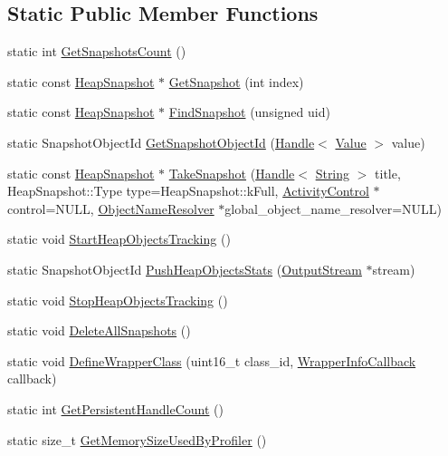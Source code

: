 \subsection*{Static Public Member Functions}
\begin{DoxyCompactItemize}
\item 
static int \hyperlink{classv8_1_1_heap_profiler_a739a665268bba6e640890464ccb60d26}{Get\+Snapshots\+Count} ()
\item 
static const \hyperlink{classv8_1_1_heap_snapshot}{Heap\+Snapshot} $\ast$ \hyperlink{classv8_1_1_heap_profiler_ad547f406908880cc7dc0453fe83cc216}{Get\+Snapshot} (int index)
\item 
static const \hyperlink{classv8_1_1_heap_snapshot}{Heap\+Snapshot} $\ast$ \hyperlink{classv8_1_1_heap_profiler_a1f77545176060f21239bd1a78e3967a7}{Find\+Snapshot} (unsigned uid)
\item 
static Snapshot\+Object\+Id \hyperlink{classv8_1_1_heap_profiler_ac15532477aaf5ad50ce569a240bf0dc8}{Get\+Snapshot\+Object\+Id} (\hyperlink{classv8_1_1_handle}{Handle}$<$ \hyperlink{classv8_1_1_value}{Value} $>$ value)
\item 
static const \hyperlink{classv8_1_1_heap_snapshot}{Heap\+Snapshot} $\ast$ \hyperlink{classv8_1_1_heap_profiler_a597f839c1fb9d2eb80f3d79b39eb8f9f}{Take\+Snapshot} (\hyperlink{classv8_1_1_handle}{Handle}$<$ \hyperlink{classv8_1_1_string}{String} $>$ title, Heap\+Snapshot\+::\+Type type=Heap\+Snapshot\+::k\+Full, \hyperlink{classv8_1_1_activity_control}{Activity\+Control} $\ast$control=N\+U\+L\+L, \hyperlink{classv8_1_1_heap_profiler_1_1_object_name_resolver}{Object\+Name\+Resolver} $\ast$global\+\_\+object\+\_\+name\+\_\+resolver=N\+U\+L\+L)
\item 
static void \hyperlink{classv8_1_1_heap_profiler_a9f3073cb75f69c54b313ee5adfd1cbdc}{Start\+Heap\+Objects\+Tracking} ()
\item 
static Snapshot\+Object\+Id \hyperlink{classv8_1_1_heap_profiler_a62189d7a17f33bf6b33d7f550f906d24}{Push\+Heap\+Objects\+Stats} (\hyperlink{classv8_1_1_output_stream}{Output\+Stream} $\ast$stream)
\item 
static void \hyperlink{classv8_1_1_heap_profiler_a94d2c61cd403ca7caf1c366418db5776}{Stop\+Heap\+Objects\+Tracking} ()
\item 
static void \hyperlink{classv8_1_1_heap_profiler_af01cf79839c61b5cc6a92c422fd9875f}{Delete\+All\+Snapshots} ()
\item 
static void \hyperlink{classv8_1_1_heap_profiler_ae83d1fc891a24ecafdca44fca2dbe07a}{Define\+Wrapper\+Class} (uint16\+\_\+t class\+\_\+id, \hyperlink{classv8_1_1_heap_profiler_a696d8d6590879eeb5a4ad2814eafb599}{Wrapper\+Info\+Callback} callback)
\item 
static int \hyperlink{classv8_1_1_heap_profiler_a328b80376e88dd3dab7d5f3744c5fefd}{Get\+Persistent\+Handle\+Count} ()
\item 
static size\+\_\+t \hyperlink{classv8_1_1_heap_profiler_aa07c18bfcd873fec16e56680d3db4fbb}{Get\+Memory\+Size\+Used\+By\+Profiler} ()
\end{DoxyCompactItemize}

